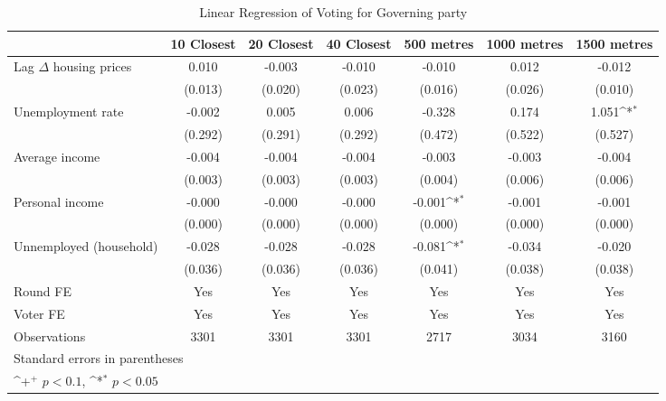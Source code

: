 \begin{table}[htbp]\centering
\def\sym#1{\ifmmode^{#1}\else\(^{#1}\)\fi}
\caption{Linear Regression of Voting for Governing party } \label{indlagiv}
\begin{tabular}{l*{6}{c}}
\hline\hline
                    &\multicolumn{1}{c}{10 Closest}&\multicolumn{1}{c}{20 Closest}&\multicolumn{1}{c}{40 Closest}&\multicolumn{1}{c}{500 metres}&\multicolumn{1}{c}{1000 metres}&\multicolumn{1}{c}{1500 metres}\\
\hline
Lag $\Delta$ housing prices&       0.010       &      -0.003       &      -0.010       &      -0.010       &       0.012       &      -0.012       \\
                    &     (0.013)       &     (0.020)       &     (0.023)       &     (0.016)       &     (0.026)       &     (0.010)       \\
[1em]
Unemployment rate   &      -0.002       &       0.005       &       0.006       &      -0.328       &       0.174       &       1.051\sym{*}\\
                    &     (0.292)       &     (0.291)       &     (0.292)       &     (0.472)       &     (0.522)       &     (0.527)       \\
[1em]
Average income      &      -0.004       &      -0.004       &      -0.004       &      -0.003       &      -0.003       &      -0.004       \\
                    &     (0.003)       &     (0.003)       &     (0.003)       &     (0.004)       &     (0.006)       &     (0.006)       \\
[1em]
Personal income     &      -0.000       &      -0.000       &      -0.000       &      -0.001\sym{*}&      -0.001       &      -0.001       \\
                    &     (0.000)       &     (0.000)       &     (0.000)       &     (0.000)       &     (0.000)       &     (0.000)       \\
[1em]
Unnemployed (household)&      -0.028       &      -0.028       &      -0.028       &      -0.081\sym{*}&      -0.034       &      -0.020       \\
                    &     (0.036)       &     (0.036)       &     (0.036)       &     (0.041)       &     (0.038)       &     (0.038)       \\
[1em]
\hline  Round FE    &         Yes       &         Yes       &         Yes       &         Yes       &         Yes       &         Yes       \\
[1em]
Voter FE            &         Yes       &         Yes       &         Yes       &         Yes       &         Yes       &         Yes       \\
\hline
Observations        &        3301       &        3301       &        3301       &        2717       &        3034       &        3160       \\
\hline\hline
\multicolumn{7}{l}{\footnotesize Standard errors in parentheses}\\
\multicolumn{7}{l}{\footnotesize \sym{+} \(p<0.1\), \sym{*} \(p<0.05\)}\\
\end{tabular}
\end{table}
